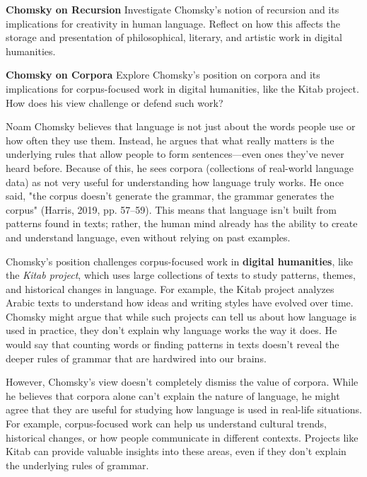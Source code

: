\documentclass[a4paper]{exam}
\begin{document}
\begin{questions}
\vspace{6cm}

\question[10] \textbf{Chomsky on Recursion} Investigate Chomsky’s notion of recursion and its implications for creativity in human language. Reflect on how this affects the storage and presentation of philosophical, literary, and artistic work in digital humanities.

\vspace{6cm}

\question[10] \textbf{Chomsky on Corpora} Explore Chomsky’s position on corpora and its implications for corpus-focused work in digital humanities, like the Kitab project. How does his view challenge or defend such work?


Noam Chomsky believes that language is not just about the words people use or how often they use them. Instead, he argues that what really matters is the underlying rules that allow people to form sentences—even ones they’ve never heard before. Because of this, he sees corpora (collections of real-world language data) as not very useful for understanding how language truly works. He once said, "the corpus doesn’t generate the grammar, the grammar generates the corpus" (Harris, 2019, pp. 57–59). This means that language isn’t built from patterns found in texts; rather, the human mind already has the ability to create and understand language, even without relying on past examples.

Chomsky’s position challenges corpus-focused work in \textbf{digital humanities}, like the \textit{Kitab project}, which uses large collections of texts to study patterns, themes, and historical changes in language. For example, the Kitab project analyzes Arabic texts to understand how ideas and writing styles have evolved over time. Chomsky might argue that while such projects can tell us about how language is used in practice, they don’t explain why language works the way it does. He would say that counting words or finding patterns in texts doesn’t reveal the deeper rules of grammar that are hardwired into our brains.

However, Chomsky’s view doesn’t completely dismiss the value of corpora. While he believes that corpora alone can’t explain the nature of language, he might agree that they are useful for studying how language is used in real-life situations. For example, corpus-focused work can help us understand cultural trends, historical changes, or how people communicate in different contexts. Projects like Kitab can provide valuable insights into these areas, even if they don’t explain the underlying rules of grammar.


\end{questions}
\end{document}
